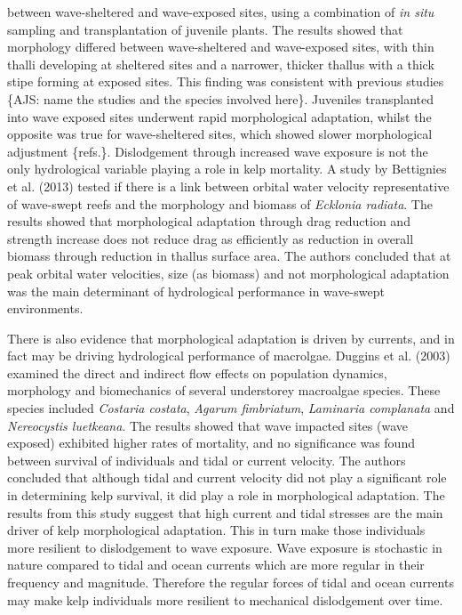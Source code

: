\documentclass[10pt,a4,]{article}
\begin{document}
between wave-sheltered and wave-exposed sites, using a combination of
\emph{in situ} sampling and transplantation of juvenile plants. The
results showed that morphology differed between wave-sheltered and
wave-exposed sites, with thin thalli developing at sheltered sites and a
narrower, thicker thallus with a thick stipe forming at exposed sites.
This finding was consistent with previous studies \{AJS: name the
studies and the species involved here\}. Juveniles transplanted into
wave exposed sites underwent rapid morphological adaptation, whilst the
opposite was true for wave-sheltered sites, which showed slower
morphological adjustment \{refs.\}. Dislodgement through increased wave
exposure is not the only hydrological variable playing a role in kelp
mortality. A study by Bettignies et al. (2013) tested if there is a link
between orbital water velocity representative of wave-swept reefs and
the morphology and biomass of \emph{Ecklonia radiata}. The results
showed that morphological adaptation through drag reduction and strength
increase does not reduce drag as efficiently as reduction in overall
biomass through reduction in thallus surface area. The authors concluded
that at peak orbital water velocities, size (as biomass) and not
morphological adaptation was the main determinant of hydrological
performance in wave-swept environments.

There is also evidence that morphological adaptation is driven by
currents, and in fact may be driving hydrological performance of
macrolgae. Duggins et al. (2003) examined the direct and indirect flow
effects on population dynamics, morphology and biomechanics of several
understorey macroalgae species. These species included \emph{Costaria
costata}, \emph{Agarum fimbriatum}, \emph{Laminaria complanata} and
\emph{Nereocystis luetkeana}. The results showed that wave impacted
sites (wave exposed) exhibited higher rates of mortality, and no
significance was found between survival of individuals and tidal or
current velocity. The authors concluded that although tidal and current
velocity did not play a significant role in determining kelp survival,
it did play a role in morphological adaptation. The results from this
study suggest that high current and tidal stresses are the main driver
of kelp morphological adaptation. This in turn make those individuals
more resilient to dislodgement to wave exposure. Wave exposure is
stochastic in nature compared to tidal and ocean currents which are more
regular in their frequency and magnitude. Therefore the regular forces
of tidal and ocean currents may make kelp individuals more resilient to
mechanical dislodgement over time.
\end{document}
